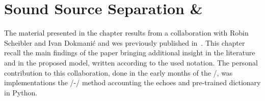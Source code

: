\chapter{Sound Source Separation \& }\label{chap:separake}

 \synopsisChSeparake

\mynewline
The material presented in the chapter results from a collaboration with Robin Scheibler and Ivan Dokmani\'{c} and wes previously published in~\cite{scheibler2018separake}.
This chapter recall the main findings of the paper bringing additional insight in the literature and in the proposed model, written according to the used notation.
The personal contribution to this collaboration, done in the early months of the \PhD/, was implementations the \EMdef/-\NMF/ method accounting the echoes and pre-trained dictionary in Python.

